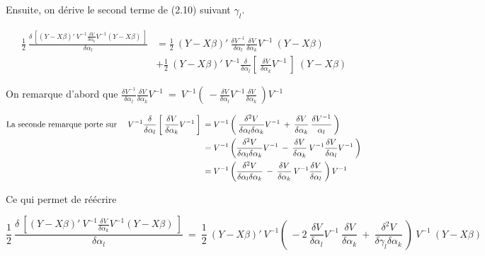 \documentclass[11pt,fleqn]{book} %
\begin{document}
\vspace{1em}

Ensuite, on dérive le second terme de (2.10) suivant $\gamma_l$.

\begin{align*}
\frac{1}{2} \:  \frac{\delta\:\left[ (Y-X\beta)' \:V^{-1} \frac{ \delta V }{\delta \alpha_k} V^{-1} (Y-X\beta)\: \right]  }{\delta \alpha_l} &= \frac{1}{2} \: (Y-X\beta)'\:  \frac{ \delta V^{-1} }{\delta \alpha_l} \frac{ \delta V }{\delta \alpha_k} V^{-1}\:(Y-X\beta)\\
	&+ \frac{1}{2} \: (Y-X\beta)'\:V^{-1} \frac{\delta}{\delta \alpha_l}\left[\:\frac{ \delta V }{\delta \alpha_k} V^{-1}\:\right]\:(Y-X\beta)
\end{align*}

\vspace{1em}

On remarque d'abord que \quad $\frac{ \delta V^{-1} }{\delta \alpha_l} \frac{ \delta V }{\delta \alpha_k} V^{-1}\:=\:
 V^{-1}  \left(\: - \frac{ \delta V }{\delta \alpha_l} V^{-1} \frac{ \delta V }{\delta \alpha_k}  \:\right) V^{-1}$

\vspace{1em}

\begin{align*}
\textnormal{La seconde remarque porte sur } \quad V^{-1}\frac{\delta}{\delta \alpha_l}\left[\:\frac{ \delta V }{\delta \alpha_k} V^{-1}\:\right] \:&= V^{-1}\left(\: \frac{ \delta^2 V }{\delta \alpha_l \delta \alpha_k} V^{-1} \:+\:  \frac{ \delta V }{\delta \alpha_k} \:  \frac{\delta V^{-1}}{\alpha_l}\:\right)\\
	&=V^{-1}\left(\frac{ \delta^2 V }{\delta \alpha_l \delta \alpha_k} V^{-1} \:-\:  \frac{ \delta V }{\delta \alpha_k} \:  V^{-1} \frac{ \delta V }{\delta \alpha_l} V^{-1}\:\right) \\
    &=V^{-1}\left(\frac{ \delta^2 V }{\delta \alpha_l \delta \alpha_k} \:-\:  \frac{ \delta V }{\delta \alpha_k} \:  V^{-1} \frac{ \delta V }{\delta \alpha_l} \:\right) V^{-1} \\
\end{align*}

Ce qui permet de réécrire 


\begin{equation*}
\frac{1}{2} \:  \frac{\delta\:\left[ (Y-X\beta)' \:V^{-1} \frac{ \delta V }{\delta \alpha_k} V^{-1} (Y-X\beta)\: \right]  }{\delta \alpha_l} \:=\: \frac{1}{2} \: (Y-X\beta)'\:V^{-1} \left(\: -2\: \frac{ \delta V }{\delta \alpha_l} V^{-1}\:  \frac{ \delta V }{\delta \alpha_k} \:+\: \frac{ \delta^2 V }{\delta \gamma_l \delta \alpha_k} \:\right)\: V^{-1}\:(Y-X\beta)
\end{equation*}
\end{document}
